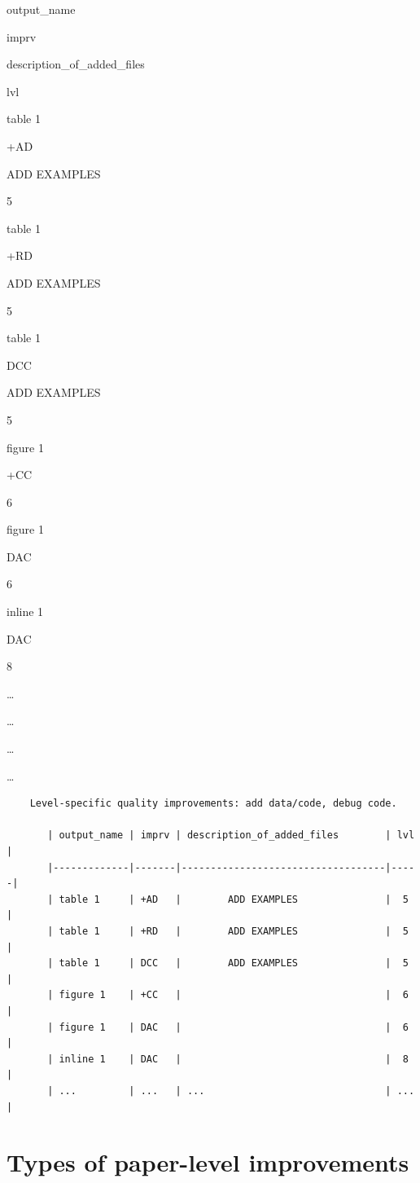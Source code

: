 \documentclass[]{book}
\begin{document}
output\_name

imprv

description\_of\_added\_files

lvl

table 1

+AD

ADD EXAMPLES

5

table 1

+RD

ADD EXAMPLES

5

table 1

DCC

ADD EXAMPLES

5

figure 1

+CC

6

figure 1

DAC

6

inline 1

DAC

8

\ldots{}

\ldots{}

\ldots{}

\ldots{}

\begin{verbatim}
    Level-specific quality improvements: add data/code, debug code.

       | output_name | imprv | description_of_added_files        | lvl |
       |-------------|-------|-----------------------------------|-----|
       | table 1     | +AD   |        ADD EXAMPLES               |  5  |
       | table 1     | +RD   |        ADD EXAMPLES               |  5  |
       | table 1     | DCC   |        ADD EXAMPLES               |  5  |
       | figure 1    | +CC   |                                   |  6  |
       | figure 1    | DAC   |                                   |  6  |
       | inline 1    | DAC   |                                   |  8  |
       | ...         | ...   | ...                               | ... |  
\end{verbatim}

\hypertarget{paper-level}{%
\section{Types of paper-level improvements}\label{paper-level}}
\end{document}
